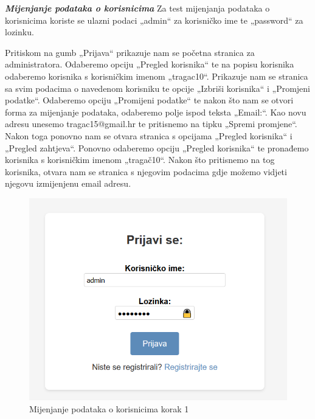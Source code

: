 			\textit{\textbf{Mijenjanje podataka o korisnicima}}
			\newline
			Za test mijenjanja podataka o korisnicima koriste se ulazni podaci 
			„admin“ za korisničko ime te „password“ za lozinku. 

			

			Pritiskom na gumb „Prijava“ prikazuje nam se početna stranica za 
			administratora. Odaberemo opciju „Pregled korisnika“ te 
			na popisu korisnika odaberemo korisnika s korisničkim imenom 
			„tragac10“. Prikazuje nam se stranica sa svim podacima o navedenom 
			korisniku te opcije „Izbriši korisnika“ i „Promjeni podatke“. 
			Odaberemo opciju „Promijeni podatke“ te nakon što nam se otvori 
			forma za mijenjanje podataka, odaberemo polje ispod teksta „Email:“. 
			Kao novu adresu unesemo tragac15@gmail.hr te pritisnemo na tipku 
			„Spremi promjene“. Nakon toga ponovno nam se otvara stranica s 
			opcijama „Pregled korisnika“ i „Pregled zahtjeva“. Ponovno 
			odaberemo opciju „Pregled korisnika“ te pronađemo korisnika s 
			korisničkim imenom „tragač10“. Nakon što pritisnemo na tog korisnika,
			 otvara nam se stranica s njegovim podacima gdje možemo vidjeti 
			 njegovu izmijenjenu email adresu.

\begin{figure}[H]
				\includegraphics[scale=0.6]{slike/test11.png}
				\centering
				\caption{Mijenjanje podataka o korisnicima korak 1}
				\label{fig:Mijenjanje podataka o korisnicima korak 1}
			\end{figure}

